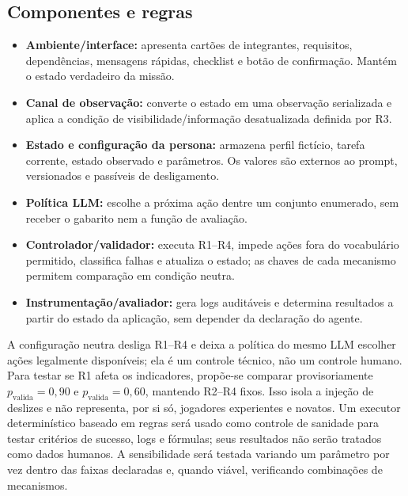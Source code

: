 \documentclass[conference]{IEEEtran}
\begin{document}
\subsection{Componentes e regras}
\begin{itemize}
\item \textbf{Ambiente/interface:} apresenta cartões de integrantes, requisitos, dependências, mensagens rápidas, checklist e botão de confirmação. Mantém o estado verdadeiro da missão.
\item \textbf{Canal de observação:} converte o estado em uma observação serializada e aplica a condição de visibilidade/informação desatualizada definida por R3.
\item \textbf{Estado e configuração da persona:} armazena perfil fictício, tarefa corrente, estado observado e parâmetros. Os valores são externos ao prompt, versionados e passíveis de desligamento.
\item \textbf{Política LLM:} escolhe a próxima ação dentre um conjunto enumerado, sem receber o gabarito nem a função de avaliação.
\item \textbf{Controlador/validador:} executa R1--R4, impede ações fora do vocabulário permitido, classifica falhas e atualiza o estado; as chaves de cada mecanismo permitem comparação em condição neutra.
\item \textbf{Instrumentação/avaliador:} gera logs auditáveis e determina resultados a partir do estado da aplicação, sem depender da declaração do agente.
\end{itemize}

A configuração neutra desliga R1--R4 e deixa a política do mesmo LLM escolher ações legalmente disponíveis; ela é um controle técnico, não um controle humano. Para testar se R1 afeta os indicadores, propõe-se comparar provisoriamente $p_{\mathrm{valida}}=0{,}90$ e $p_{\mathrm{valida}}=0{,}60$, mantendo R2--R4 fixos. Isso isola a injeção de deslizes e não representa, por si só, jogadores experientes e novatos. Um executor determinístico baseado em regras será usado como controle de sanidade para testar critérios de sucesso, logs e fórmulas; seus resultados não serão tratados como dados humanos. A sensibilidade será testada variando um parâmetro por vez dentro das faixas declaradas e, quando viável, verificando combinações de mecanismos.
\end{document}

